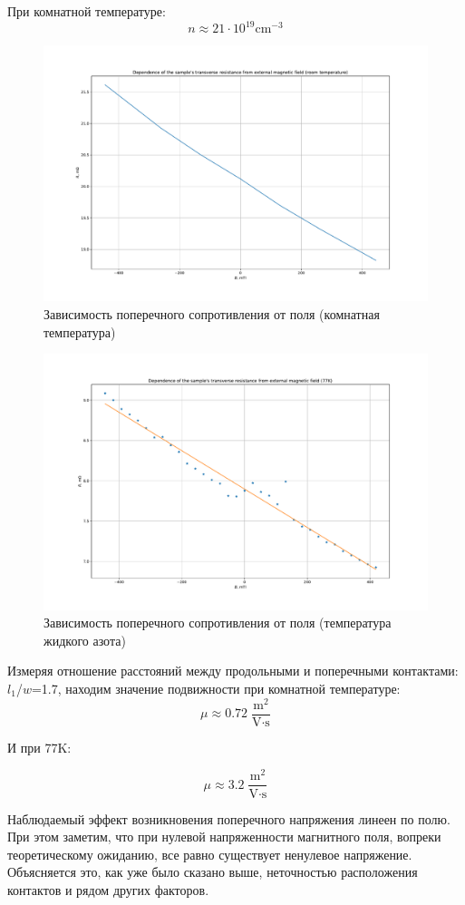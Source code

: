 \documentclass[a4paper, 12pt]{article}
\begin{document}
При комнатной температуре:
$$n\approx21 \cdot 10^{19}\text{cm}^{-3}$$ 
\begin{figure}[H]
	\centering
	\includegraphics[width=0.8\linewidth]{3_room.pdf}
	\caption{Зависимость поперечного сопротивления от поля (комнатная температура)}
	\label{fig:3_room}
\end{figure}

\begin{figure}[H]
	\centering
	\includegraphics[width=0.8\linewidth]{3_cold.pdf}
	\caption{Зависимость поперечного  сопротивления от поля (температура жидкого азота)}
	\label{fig:3_cold}
\end{figure}

Измеряя отношение расстояний между продольными и поперечными контактами: $l_1$/$w$=1.7, находим значение подвижности при комнатной температуре:
$$\mu\approx 0.72  \; \frac{\text{m}^2}{\text{V} \cdot \text{s}}$$

И при 77K:

$$\mu\approx 3.2   \; \frac{\text{m}^2}{\text{V} \cdot \text{s}}$$

Наблюдаемый эффект возникновения поперечного напряжения линеен по полю. При этом заметим, что при нулевой напряженности магнитного поля, вопреки теоретическому ожиданию, все равно существует ненулевое напряжение. Объясняется это, как уже было сказано выше, неточностью расположения контактов и рядом других факторов. 
\end{document}
